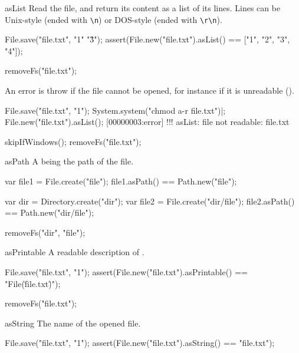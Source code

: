 \begin{urbiscriptapi}
\item[asList] Read the file, and return its content as a list of its lines.
  Lines can be Unix-style (ended with \lstinline|\n|) or DOS-style (ended
  with \lstinline|\r\n|).
\begin{urbiscript}
File.save("file.txt", "1\n"  "3\r{}\r\n");
assert(File.new("file.txt").asList() == ["1", "2", "3", "4"]);
\end{urbiscript}
\begin{urbicomment}
removeFs("file.txt");
\end{urbicomment}

An error is throw if the file cannot be opened, for instance if it is
unreadable ().

\begin{urbiscript}[firstnumber=1]
File.save("file.txt", "1\n");
System.system("chmod a-r file.txt")|;
File.new("file.txt").asList();
[00000003:error] !!! asList: file not readable: file.txt
\end{urbiscript}
\begin{urbicomment}
skipIfWindows();
removeFs("file.txt");
\end{urbicomment}

\item[asPath] A  being the path of the file.
\begin{urbiassert}[firstnumber=1]
var file1 = File.create("file");
file1.asPath() == Path.new("file");

var dir = Directory.create("dir");
var file2 = File.create("dir/file");
file2.asPath() == Path.new("dir/file");
\end{urbiassert}
\begin{urbicomment}
removeFs("dir", "file");
\end{urbicomment}


\item[asPrintable]
  A readable description of \this.
\begin{urbiscript}
File.save("file.txt", "1\n");
assert(File.new("file.txt").asPrintable() == "File(\"file.txt\")");
\end{urbiscript}
\begin{urbicomment}
removeFs("file.txt");
\end{urbicomment}


\item[asString]
  The name of the opened file.
\begin{urbiscript}
File.save("file.txt", "1\n");
assert(File.new("file.txt").asString() == "file.txt");
\end{urbiscript}



\end{urbiscriptapi}
